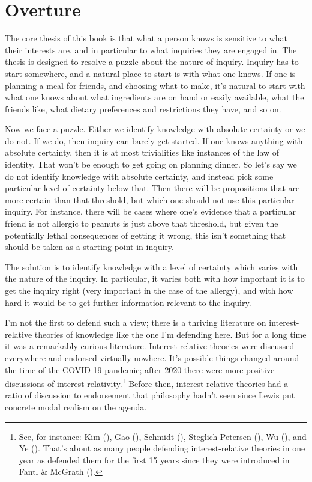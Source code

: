 \documentclass[
  10pt,
  letterpaper,
  twoside]{scrbook}
\begin{document}

\chapter{Overture}\label{sec-overture}

The core thesis of this book is that what a person knows is sensitive to
what their interests are, and in particular to what inquiries they are
engaged in. The thesis is designed to resolve a puzzle about the nature
of inquiry. Inquiry has to start somewhere, and a natural place to start
is with what one knows. If one is planning a meal for friends, and
choosing what to make, it's natural to start with what one knows about
what ingredients are on hand or easily available, what the friends like,
what dietary preferences and restrictions they have, and so on.

Now we face a puzzle. Either we identify knowledge with absolute
certainty or we do not. If we do, then inquiry can barely get started.
If one knows anything with absolute certainty, then it is at most
trivialities like instances of the law of identity. That won't be enough
to get going on planning dinner. So let's say we do not identify
knowledge with absolute certainty, and instead pick some particular
level of certainty below that. Then there will be propositions that are
more certain than that threshold, but which one should not use this
particular inquiry. For instance, there will be cases where one's
evidence that a particular friend is not allergic to peanuts is just
above that threshold, but given the potentially lethal consequences of
getting it wrong, this isn't something that should be taken as a
starting point in inquiry.

The solution is to identify knowledge with a level of certainty which
varies with the nature of the inquiry. In particular, it varies both
with how important it is to get the inquiry right (very important in the
case of the allergy), and with how hard it would be to get further
information relevant to the inquiry.

I'm not the first to defend such a view; there is a thriving literature
on interest-relative theories of knowledge like the one I'm defending
here. But for a long time it was a remarkably curious literature.
Interest-relative theories were discussed everywhere and endorsed
virtually nowhere. It's possible things changed around the time of the
COVID-19 pandemic; after 2020 there were more positive discussions of
interest-relativity.\footnote{See, for instance: Kim
  (), Gao (),
  Schmidt (), Steglich-Petersen
  (), Wu
  (), and Ye
  (). That's about as many people
  defending interest-relative theories in one year as defended them for
  the first 15 years since they were introduced in Fantl \& McGrath
  ().} Before then,
interest-relative theories had a ratio of discussion to endorsement that
philosophy hadn't seen since Lewis put concrete modal realism on the
agenda.
\end{document}

